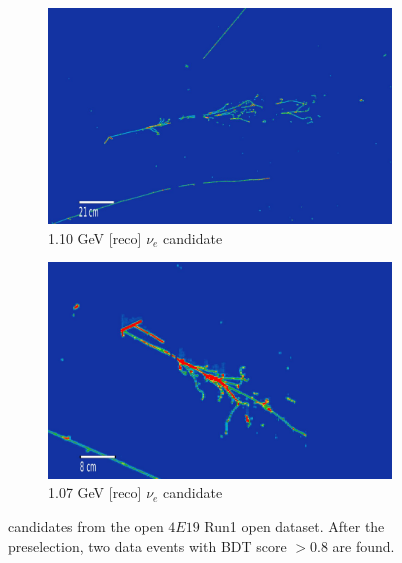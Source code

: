 \begin{figure}[H] 
\begin{center}
    \begin{subfigure}[b]{0.45\textwidth}
    \centering
    \includegraphics[width=1.00\textwidth]{1eNp/1eNp_box_evd1.png}
    \caption{\label{fig:1eNp:box:evd1}1.10 GeV [reco] $\nu_e$ candidate}
    \end{subfigure}
    \begin{subfigure}[b]{0.45\textwidth}
    \centering
    \includegraphics[width=1.00\textwidth]{1eNp/1eNp_box_evd2.png}
    \caption{\label{fig:1eNp:box:evd2}1.07 GeV [reco] $\nu_e$ candidate}
    \end{subfigure}
\caption{\label{fig:1eNp:box:evd} \npsel candidates from the open $4E19$ Run1 open dataset. After the \npsel preselection, two data events with BDT score $> 0.8$ are found.}
\end{center}
\end{figure}

